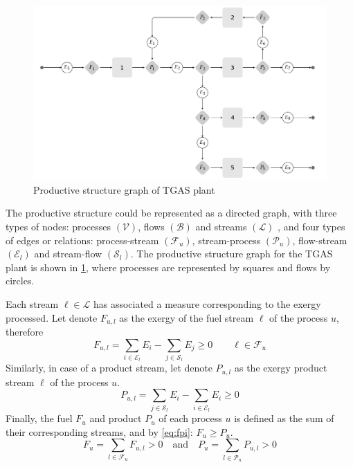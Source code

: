 \documentclass{ecos}
\begin{document}
\begin{figure}[htpb]
	\centering
	\includegraphics[width=0.98\linewidth]{tgasfp1}
	\caption{Productive structure graph of TGAS plant}
	\label{tgasfp}
\end{figure}

The productive structure could be represented as a directed graph, with three types of nodes: processes $(\mathcal{V})$, flows $(\mathcal{B})$ and streams $(\mathcal{L})$ , and four types of edges or relations: process-stream  $(\mathcal{F}_u)$, stream-process $(\mathcal{P}_u)$, flow-stream $(\mathcal{E}_l)$ and stream-flow $(\mathcal{S}_l)$. The productive structure graph for the TGAS plant is shown in \cref{tgasfp}, where processes are represented by squares and flows by circles.

Each stream $\ell \in \mathcal{L}$ has associated a measure corresponding to the exergy processed. Let denote $F_{u,l}$ as the exergy of the fuel stream $\ell$ of the process $u$, therefore
\begin{equation}
F_{u,l} = \sum_{i\in\mathcal{E}_l} E_i - \sum_{j\in\mathcal{S}_l} E_j \ge 0 \qquad \ell\in\mathcal{F}_u
\label{eq:fs}
\end{equation}
\label{eq2_3}
Similarly, in case of a product stream, let denote  $P_{u,l}$ as the exergy  product stream $\ell$ of the process $u$.
\begin{equation}
P_{u,l}=\sum_{j\in\mathcal{S}_l} E_i - \sum_{i\in\mathcal{E}_l} E_i \ge 0
\label{eq:ps}
\end{equation}
Finally, the fuel $F_u$ and product $P_u$ of each process $u$ is defined as the sum of their corresponding streams, and by \cref{eq:fpi}: $F_u \ge P_u$. 
\begin{equation}
F_u=\sum_{l\in\mathcal{F}_u} F_{u,l} > 0 \quad\text{and} \quad P_u=\sum_{l\in\mathcal{P}_u} P_{u,l} > 0
\end{equation}
\end{document}
